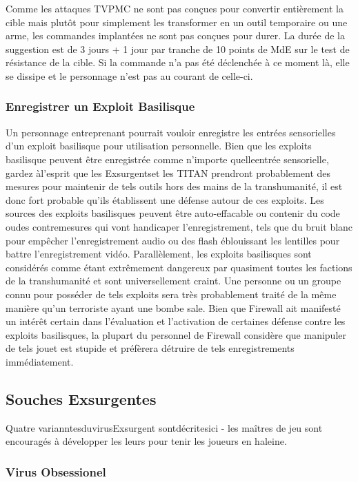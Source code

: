 Comme les attaques TVPMC ne sont pas conçues pour convertir entièrement la cible mais plutôt pour simplement les transformer en un outil temporaire ou une arme, les commandes implantées ne sont pas conçues pour durer. La durée de la suggestion est de 3 jours + 1 jour par tranche de 10 points de MdE sur le test de résistance de la cible. Si la commande n'a pas été déclenchée à ce moment là, elle se dissipe et le personnage n'est pas au courant de celle-ci. 

\subsubsection{Enregistrer un Exploit Basilisque} 

Un personnage entreprenant pourrait vouloir enregistre les entrées sensorielles d'un exploit basilisque pour utilisation personnelle. Bien que les exploits basilisque peuvent être enregistrée comme n'importe quelleentrée sensorielle, gardez àl'esprit que les Exsurgentset les TITAN prendront probablement des mesures pour maintenir de tels outils hors des mains de la transhumanité, il est donc fort probable qu'ils établissent une défense autour de ces exploits. Les sources des exploits basilisques peuvent être auto-effacable ou contenir du code oudes contremesures qui vont handicaper l'enregistrement, tels que du bruit blanc pour empêcher l'enregistrement audio ou des flash éblouissant les lentilles pour battre l'enregistrement vidéo. Parallèlement, les exploits basilisques sont considérés comme étant extrêmement dangereux par quasiment toutes les factions de la transhumanité et sont universellement craint. Une personne ou un groupe connu pour posséder de tels exploits sera très probablement traité de la même manière qu'un terroriste ayant une bombe sale. Bien que Firewall ait manifesté un intérêt certain dans l'évaluation et l'activation de certaines défense contre les exploits basilisques, la plupart du personnel de Firewall considère que manipuler de tels jouet est stupide et préfèrera détruire de tels enregistrements immédiatement. 

\subsection{Souches Exsurgentes} 

Quatre varianntesduvirusExsurgent sontdécritesici - les maîtres de jeu sont encouragés à développer les leurs pour tenir les joueurs en haleine. 

\subsubsection{Virus Obsessionel} 

